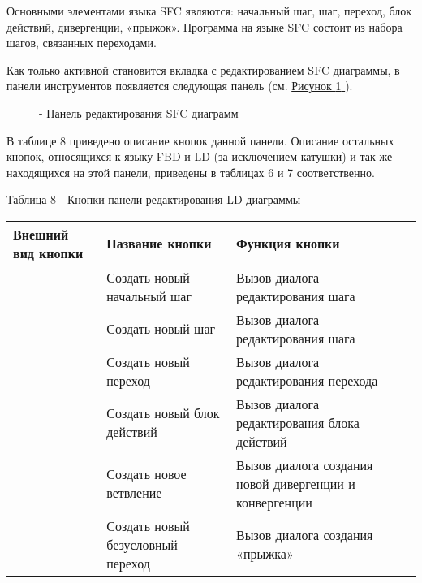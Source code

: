 \documentclass[letterpaper,10pt,russian]{sphinxmanual}
\begin{document}
Основными элементами языка SFC являются: начальный шаг, шаг, переход,
блок действий, дивергенции, «прыжок». Программа на языке SFC состоит из
набора шагов, связанных переходами.

Как только активной становится вкладка с редактированием SFC диаграммы,
в панели инструментов появляется следующая панель (см. \hyperref[usage_guide/ide_components:image82]{Рисунок \ref{usage_guide/ide_components:image82} }).
\begin{figure}[htbp]
\centering
\capstart

\noindent{}
\caption{- Панель редактирования SFC диаграмм}\label{usage_guide/ide_components:image82}\end{figure}

В таблице 8 приведено описание кнопок данной панели. Описание остальных
кнопок, относящихся к языку FBD и LD (за исключением катушки) и так же
находящихся на этой панели, приведены в таблицах 6 и 7 соответственно.

Таблица 8 - Кнопки панели редактирования LD диаграммы

\noindent\begin{tabulary}{\linewidth}{|L|L|L|}
\hline
\textsf{\relax 
Внешний вид кнопки
\unskip}\relax &\textsf{\relax 
Название кнопки
\unskip}\relax &\textsf{\relax 
Функция кнопки
\unskip}\relax \\
\hline
{}
&
Создать новый
начальный шаг
&
Вызов диалога
редактирования шага
\\
\hline
{}
&
Создать новый шаг
&
Вызов диалога
редактирования шага
\\
\hline
{}
&
Создать новый переход
&
Вызов диалога
редактирования
перехода
\\
\hline
{}
&
Создать новый блок
действий
&
Вызов диалога
редактирования блока
действий
\\
\hline
{}
&
Создать новое
ветвление
&
Вызов диалога
создания новой
дивергенции и
конвергенции
\\
\hline
{}
&
Создать новый
безусловный переход
&
Вызов диалога
создания «прыжка»
\\
\hline\end{tabulary}
\end{document}
